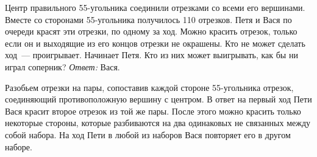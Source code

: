 \problem
Центр правильного 55-угольника соединили отрезками со всеми его вершинами.
Вместе со сторонами 55-угольника получилось 110 отрезков.
Петя и Вася по очереди красят эти отрезки, по одному за ход.
Можно красить отрезок, только если он и выходящие из его концов отрезки не
окрашены.
Кто не может сделать ход~--- проигрывает.
Начинает Петя.
Кто из них может выигрывать, как бы ни играл соперник?
\solution
\emph{Ответ:} Вася.
\par
Разобьем отрезки на пары, сопоставив каждой стороне 55-уголь\-ника отрезок,
соединяющий противоположную вершину с центром.
В ответ на первый ход Пети Вася красит второе отрезок из той же пары.
После этого можно красить только некоторые стороны, которые разбиваются на два
одинаковых не связанных между собой набора.
На ход Пети в любой из наборов Вася повторяет его в другом наборе.
\endproblem
